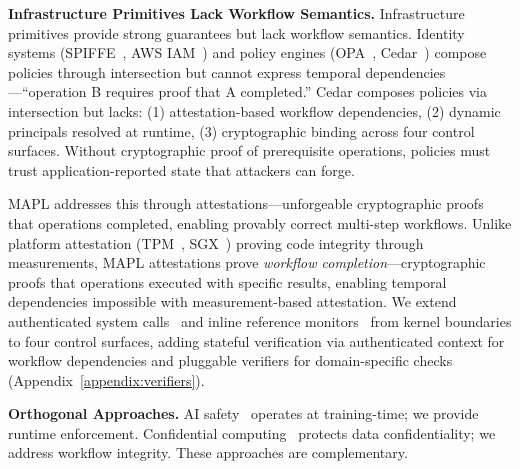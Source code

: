 \textbf{Infrastructure Primitives Lack Workflow Semantics.} Infrastructure primitives provide strong guarantees but lack workflow semantics. Identity systems (SPIFFE~\cite{spiffe2023}, AWS IAM~\cite{aws-iam2023}) and policy engines (OPA~\cite{opa2023}, Cedar~\cite{cedar2023}) compose policies through intersection but cannot express temporal dependencies—``operation B requires proof that A completed.'' Cedar composes policies via intersection but lacks: (1) attestation-based workflow dependencies, (2) dynamic principals resolved at runtime, (3) cryptographic binding across four control surfaces. Without cryptographic proof of prerequisite operations, policies must trust application-reported state that attackers can forge.

MAPL addresses this through attestations—unforgeable cryptographic proofs that operations completed, enabling provably correct multi-step workflows. Unlike platform attestation (TPM~\cite{tcg2016}, SGX~\cite{costan2016intel}) proving code integrity through measurements, MAPL attestations prove \textit{workflow completion}—cryptographic proofs that operations executed with specific results, enabling temporal dependencies impossible with measurement-based attestation. We extend authenticated system calls~\cite{rajagopalan2006} and inline reference monitors~\cite{erlingsson2004,schneider2000} from kernel boundaries to four control surfaces, adding stateful verification via authenticated context for workflow dependencies and pluggable verifiers for domain-specific checks (Appendix~\ref{appendix:verifiers}).

\textbf{Orthogonal Approaches.} AI safety~\cite{constitutional_ai2022,ouyang2022training,ganguli2022redteaming} operates at training-time; we provide runtime enforcement. Confidential computing~\cite{costan2016intel,gentry2009fully} protects data confidentiality; we address workflow integrity. These approaches are complementary.
